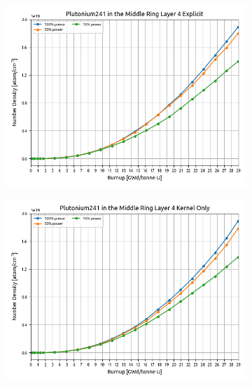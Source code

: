 \documentclass[letterpaper]{physor2024}
\begin{document}
\begin{figure}[!h]
    \centering
    \begin{subfigure}{0.495\linewidth}
        \centering
        \includegraphics[width=\linewidth]{figures/explicit_Pu_241.png}
    \end{subfigure}
    \begin{subfigure}{0.495\linewidth}
        \centering
        \includegraphics[width=\linewidth]{figures/kernel_only_Pu_241.png}
    \end{subfigure}
    \begin{subfigure}{0.495\linewidth}
        \centering

\end{subfigure}
\end{figure}
\end{document}
